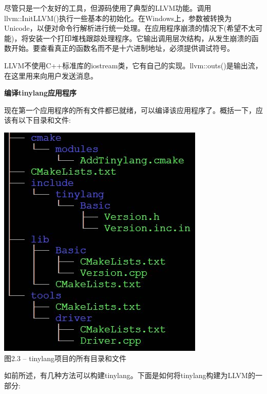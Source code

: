 尽管只是一个友好的工具，但源码使用了典型的LLVM功能。调用llvm::InitLLVM()执行一些基本的初始化。在Windows上，参数被转换为Unicode，以便对命令行解析进行统一处理。在应用程序崩溃的情况下(希望不太可能)，将安装一个打印堆栈跟踪处理程序。它输出调用层次结构，从发生崩溃的函数开始。要查看真正的函数名而不是十六进制地址，必须提供调试符号。\par

LLVM不使用C++标准库的iostream类，它有自己的实现。llvm::outs()是输出流，在这里用来向用户发送消息。\par

\hspace*{\fill} \par %
\textbf{编译tinylang应用程序}

现在第一个应用程序的所有文件都已就绪，可以编译该应用程序了。概括一下，应该有以下目录和文件:\par

\hspace*{\fill} \par %
\begin{center}
	\includegraphics{content/1/chapter2/images/3.jpg}\\
	图2.3 – tinylang项目的所有目录和文件
\end{center}

如前所述，有几种方法可以构建tinylang。下面是如何将tinylang构建为LLVM的一部分:\par

